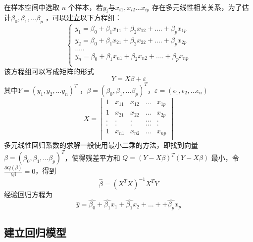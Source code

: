 \documentclass [a4paper]{article}
\begin{document}
在样本空间中选取 $n$ 个样本，若$y_i$与$x_{i1},x_{i2}...x_{ip}$ 存在多元线性相关关系，为了估计$\beta_0,\beta_1,...\beta_p$ ，可以建立以下方程组：
$$
\left\{
\begin{aligned}
y_1 = \beta_0+\beta_1x_{11}+\beta_2x_{12}+....+\beta_px_{1p}\\
y_2 = \beta_0+\beta_1x_{21}+\beta_2x_{22}+....+\beta_px_{2p}\\
.....\\
y_n = \beta_0+\beta_1x_{n1}+\beta_2x_{n2}+....+\beta_px_{np}\\
\end{aligned}
\right.
$$
该方程组可以写成矩阵的形式
$$
Y = X\beta +\varepsilon
$$
其中$Y=(y_1,y_2,...y_n)^T$ ，$\beta = (\beta_0,\beta_1,...\beta_p)^T$，$\varepsilon = (\epsilon_1,\epsilon_2,...\epsilon_n)$
$$
X = \begin{bmatrix}
1&x_{11}&x_{12}&...&x_{1p} \\
1&x_{21}&x_{22}&...&x_{2p} \\
.&.&.&...&.\\
.&.&.&...&.\\
1&x_{n1}&x_{n2}&...&x_{np} \\
\end{bmatrix}
$$
多元线性回归系数的求解一般使用最小二乘的方法，即找到向量$\beta = (\beta_0,\beta_1,...\beta_p)^T$，使得残差平方和 $Q=(Y-X\beta)^T(Y-X\beta)$ 最小，令$\frac{\partial Q(\beta)}{\partial \beta}=0$，得到
$$
\hat\beta = (X^TX)^{-1}X^TY
$$
经验回归方程为
$$
\hat y = \hat{\beta_0}+\hat{\beta_1}x_1+\hat{\beta_1}x_2+...++\hat{\beta_p}x_p
$$

\subsection{建立回归模型}
\end{document}
